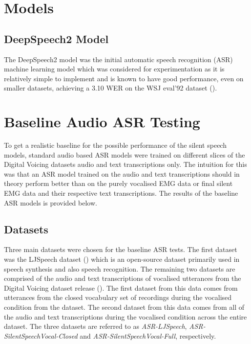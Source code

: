 \section{Models}

\subsection{DeepSpeech2 Model}

The DeepSpeech2 model was the initial automatic speech recognition (ASR) machine
learning model which was considered for experimentation as it is relatively simple to
implement and is known to have good performance, even on smaller datasets, achieving
a 3.10 WER on the WSJ eval'92 dataset
(\cite{DS2_original}).

\section{Baseline Audio ASR Testing}

To get a realistic baseline for the possible performance of the silent
speech models, standard audio based ASR models were trained on different
slices of the Digital Voicing datasets audio and text transcriptions only.
The intuition for this was that an ASR model trained on the audio and text
transcriptions should in theory perform better than on the purely vocalised
EMG data or final silent EMG data and their respective text transcriptions.
The results of the baseline ASR models is provided below.

\subsection{Datasets}

Three main datasets were chosen for the baseline ASR tests. The first dataset
was the LJSpeech dataset
(\cite{ljspeech17})
which is an open-source dataset primarily used in
speech synthesis and also speech recognition. The remaining two datasets
are comprised of the audio and text transcriptions of vocalised
utterances from the Digital Voicing dataset release (\cite{gaddy2020digital}).
The first dataset from this data comes from utterances from the closed
vocabulary set of recordings during the vocalised condition from the dataset.
The second dataset from this data comes from
all of the audio and text transcriptions during the vocalised condition across
the entire dataset. The three datasets are referred to as
\textit{ASR-LJSpeech}, \textit{ASR-SilentSpeechVocal-Closed} and
\textit{ASR-SilentSpeechVocal-Full},
respectively.

